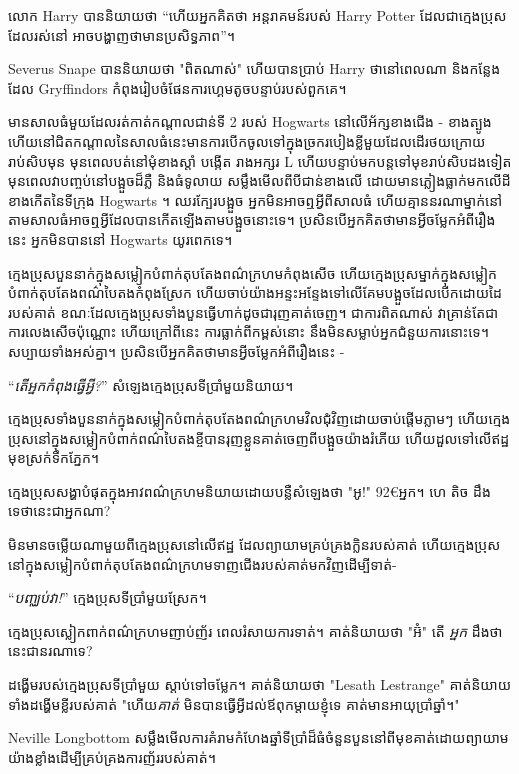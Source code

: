 {{{លោក Harry បាននិយាយថា “ហើយអ្នកគិតថា អន្តរាគមន៍របស់ Harry Potter ដែលជាក្មេងប្រុសដែលរស់នៅ អាចបង្ហាញថាមានប្រសិទ្ធភាព”។

Severus Snape បាននិយាយថា "ពិតណាស់" ហើយបានប្រាប់ Harry ថានៅពេលណា និងកន្លែងដែល Gryffindors កំពុងរៀបចំផែនការហ្គេមតូចបន្ទាប់របស់ពួកគេ។

\later

មានសាលធំមួយដែលរត់កាត់កណ្តាលជាន់ទី 2 របស់ Hogwarts នៅលើអ័ក្សខាងជើង - ខាងត្បូង ហើយនៅជិតកណ្តាលនៃសាលធំនេះមានការបើកចូលទៅក្នុងច្រករបៀងខ្លីមួយដែលដើរថយក្រោយរាប់សិបមុន មុនពេលបត់នៅមុំខាងស្តាំ បង្កើត រាងអក្សរ L ហើយបន្ទាប់មកបន្តទៅមុខរាប់សិបដងទៀត មុនពេលវាបញ្ចប់នៅបង្អួចដ៏ភ្លឺ និងធំទូលាយ សម្លឹងមើលពីបីជាន់ខាងលើ ដោយមានភ្លៀងធ្លាក់មកលើដីខាងកើតនៃទីក្រុង Hogwarts ។ ឈរក្បែរបង្អួច អ្នកមិនអាចឮអ្វីពីសាលធំ ហើយគ្មាននរណាម្នាក់នៅតាមសាលធំអាចឮអ្វីដែលបានកើតឡើងតាមបង្អួចនោះទេ។ ប្រសិនបើអ្នកគិតថាមានអ្វីចម្លែកអំពីរឿងនេះ អ្នកមិនបាននៅ Hogwarts យូរពេកទេ។

ក្មេងប្រុសបួននាក់ក្នុងសម្លៀកបំពាក់តុបតែងពណ៌ក្រហមកំពុងសើច ហើយក្មេងប្រុសម្នាក់ក្នុងសម្លៀកបំពាក់តុបតែងពណ៌បៃតងកំពុងស្រែក ហើយចាប់យ៉ាងអន្ទះអន្ទែងទៅលើគែមបង្អួចដែលបើកដោយដៃរបស់គាត់ ខណៈដែលក្មេងប្រុសទាំងបួនធ្វើហាក់ដូចជារុញគាត់ចេញ។ ជាការពិតណាស់ វាគ្រាន់តែជាការលេងសើចប៉ុណ្ណោះ ហើយក្រៅពីនេះ ការធ្លាក់ពីកម្ពស់នោះ នឹងមិនសម្លាប់អ្នកជំនួយការនោះទេ។ សប្បាយទាំងអស់គ្នា។ ប្រសិនបើអ្នកគិតថាមានអ្វីចម្លែកអំពីរឿងនេះ -

“\emph{តើអ្នកកំពុងធ្វើអ្វី?}” សំឡេងក្មេងប្រុសទីប្រាំមួយនិយាយ។

ក្មេងប្រុសទាំងបួននាក់ក្នុងសម្លៀកបំពាក់តុបតែងពណ៌ក្រហមវិលជុំវិញដោយចាប់ផ្តើមភ្លាមៗ ហើយក្មេងប្រុសនៅក្នុងសម្លៀកបំពាក់ពណ៌បៃតងខ្ចីបានរុញខ្លួនគាត់ចេញពីបង្អួចយ៉ាងរំភើយ ហើយដួលទៅលើឥដ្ឋ មុខស្រក់ទឹកភ្នែក។

ក្មេងប្រុសសង្ហាបំផុតក្នុងអាវពណ៌ក្រហមនិយាយដោយបន្លឺសំឡេងថា "អូ!" 92€{អ្នក}។ ហេ តិច ដឹងទេថានេះជាអ្នកណា?

មិនមានចម្លើយណាមួយពីក្មេងប្រុសនៅលើឥដ្ឋ ដែលព្យាយាមគ្រប់គ្រងក្លិនរបស់គាត់ ហើយក្មេងប្រុសនៅក្នុងសម្លៀកបំពាក់តុបតែងពណ៌ក្រហមទាញជើងរបស់គាត់មកវិញដើម្បីទាត់-

“\emph{បញ្ឈប់វា!}” ក្មេងប្រុសទីប្រាំមួយស្រែក។

ក្មេង​ប្រុស​ស្លៀក​ពាក់​ពណ៌​ក្រហម​ញាប់​ញ័រ ពេល​រំសាយ​ការ​ទាត់។ គាត់និយាយថា "អ៊ំ" តើ \emph{អ្នក} ដឹងថានេះជានរណាទេ?

ដង្ហើមរបស់ក្មេងប្រុសទីប្រាំមួយ ស្តាប់ទៅចម្លែក។ គាត់និយាយថា "Lesath Lestrange" គាត់និយាយទាំងដង្ហើមខ្លីរបស់គាត់ "ហើយ\emph{គាត់} មិនបានធ្វើអ្វីដល់ឪពុកម្តាយខ្ញុំទេ គាត់មានអាយុប្រាំឆ្នាំ។"

\later

Neville Longbottom សម្លឹងមើលការគំរាមកំហែងឆ្នាំទីប្រាំដ៏ធំចំនួនបួននៅពីមុខគាត់ដោយព្យាយាមយ៉ាងខ្លាំងដើម្បីគ្រប់គ្រងការញ័ររបស់គាត់។

}}}
